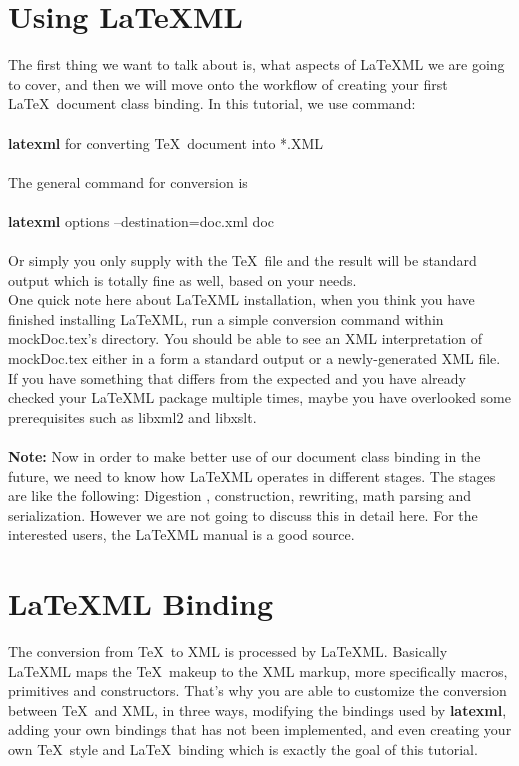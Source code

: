 \documentclass{book}
\begin{document}
\section{Using LaTeXML}
The first thing we want to talk about is, what aspects of \LaTeX ML we are going to cover, and then we will move onto the 
workflow of creating your first \LaTeX\ document class binding. In this  tutorial, we  use command:\\ \\
\textbf{latexml} for converting \TeX \ document into *.XML \\ \\
The general command for conversion is \\ \\
\textbf{latexml} {options} --destination=doc.xml doc \\ \\
Or simply you only supply with the \TeX\ file and the result will be standard output which is totally fine as well,
based on your needs. \\
One quick note here about \LaTeX ML installation, when you think you have finished installing \LaTeX ML, run
a simple conversion command within mockDoc.tex's directory. You should be able to see an XML interpretation of
mockDoc.tex either in a form a standard output or a newly-generated XML file. If you have something that differs from
the expected and you have already checked your \LaTeX ML package multiple times, maybe you have overlooked some prerequisites such as 
libxml2 and libxslt. \\ \\
\textbf{Note:}
Now in order to make better use of our document class binding in the future, we need to know how \LaTeX ML 
operates in different stages. The stages are like the following: Digestion , construction, rewriting, math parsing and serialization.
However we are not going to discuss this in detail here. For the interested users, the \LaTeX ML manual is a good source.
\section{LaTeXML Binding}
The conversion from \TeX\  to XML is processed by \LaTeX ML. Basically \LaTeX ML maps the \TeX \ makeup to
the XML markup, more specifically macros, primitives and constructors. That's why you are able to customize the conversion 
between \TeX\  and XML, in three ways, modifying the bindings used by \textbf{latexml}, adding your own bindings that has not been
implemented, and even creating your own \TeX \ style and \LaTeX\  binding which is exactly the goal of this tutorial.
\end{document}
